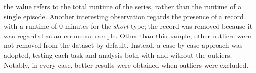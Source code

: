 the value refers to the total runtime of the series, rather than the runtime of a single episode.
Another interesting observation regards the presence of a record with a runtime of 0 minutes for the \textit{short} type;
the record was removed because it was regarded as an erroneous sample.
Other than this sample, other outliers were not removed from the dataset by default. Instead, a case-by-case approach was adopted,
testing each task and analysis both with and without the outliers. Notably, in every case, better results were obtained when outliers were excluded.